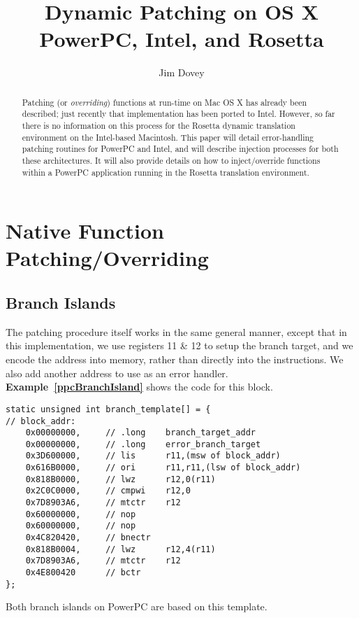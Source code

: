 \documentclass[english]{article}
\begin{document}
\title{Dynamic Patching on OS X PowerPC, Intel, and Rosetta}
\author{Jim Dovey}
\maketitle

\begin{abstract}
Patching (or \emph{overriding}) functions at run-time on Mac OS X has already been described\cite{rentzsch03}; just recently that implementation has been ported to Intel\cite{guiheneuf06}. However, so far there is no information on this process for the Rosetta dynamic translation environment on the Intel-based Macintosh. This paper will detail error-handling patching routines for PowerPC and Intel, and will describe injection processes for both these architectures. It will also provide details on how to inject/override functions within a PowerPC application running in the Rosetta translation environment.
\end{abstract}

\tableofcontents

\section{Native Function Patching/Overriding}
\subsection{Branch Islands}
The patching procedure itself works in the same general manner, except that in this implementation, we use registers 11 \& 12 to setup the branch target, and we encode the address into memory, rather than directly into the instructions. We also add another address to use as an error handler. \textbf{Example~\ref{ppcBranchIsland}} shows the code for this block.

\begin{sourcecode}
\begin{verbatim}
static unsigned int branch_template[] = {
// block_addr:
    0x00000000,     // .long    branch_target_addr
    0x00000000,     // .long    error_branch_target
    0x3D600000,     // lis      r11,(msw of block_addr)
    0x616B0000,     // ori      r11,r11,(lsw of block_addr)
    0x818B0000,     // lwz      r12,0(r11)
    0x2C0C0000,     // cmpwi    r12,0
    0x7D8903A6,     // mtctr    r12
    0x60000000,     // nop
    0x60000000,     // nop
    0x4C820420,     // bnectr
    0x818B0004,     // lwz      r12,4(r11)
    0x7D8903A6,     // mtctr    r12
    0x4E800420      // bctr
};
\end{verbatim}
\caption{Both branch islands on PowerPC are based on this template.}
\label{ppcBranchIsland}
\end{sourcecode}
\end{document}
